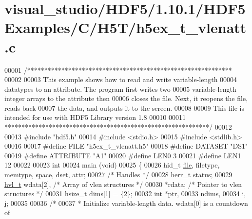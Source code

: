 \hypertarget{visual__studio_2_h_d_f5_21_810_81_2_h_d_f5_examples_2_c_2_h5_t_2h5ex__t__vlenatt_8c_source}{}\section{visual\+\_\+studio/\+H\+D\+F5/1.10.1/\+H\+D\+F5\+Examples/\+C/\+H5\+T/h5ex\+\_\+t\+\_\+vlenatt.c}
\label{visual__studio_2_h_d_f5_21_810_81_2_h_d_f5_examples_2_c_2_h5_t_2h5ex__t__vlenatt_8c_source}

\begin{DoxyCode}
00001 \textcolor{comment}{/************************************************************}
00002 \textcolor{comment}{}
00003 \textcolor{comment}{  This example shows how to read and write variable-length}
00004 \textcolor{comment}{  datatypes to an attribute.  The program first writes two}
00005 \textcolor{comment}{  variable-length integer arrays to the attribute then}
00006 \textcolor{comment}{  closes the file.  Next, it reopens the file, reads back}
00007 \textcolor{comment}{  the data, and outputs it to the screen.}
00008 \textcolor{comment}{}
00009 \textcolor{comment}{  This file is intended for use with HDF5 Library version 1.8}
00010 \textcolor{comment}{}
00011 \textcolor{comment}{ ************************************************************/}
00012 
00013 \textcolor{preprocessor}{#include "hdf5.h"}
00014 \textcolor{preprocessor}{#include <stdio.h>}
00015 \textcolor{preprocessor}{#include <stdlib.h>}
00016 
00017 \textcolor{preprocessor}{#define FILE            "h5ex\_t\_vlenatt.h5"}
00018 \textcolor{preprocessor}{#define DATASET         "DS1"}
00019 \textcolor{preprocessor}{#define ATTRIBUTE       "A1"}
00020 \textcolor{preprocessor}{#define LEN0            3}
00021 \textcolor{preprocessor}{#define LEN1            12}
00022 
00023 \textcolor{keywordtype}{int}
00024 main (\textcolor{keywordtype}{void})
00025 \{
00026     hid\_t       \hyperlink{structfile}{file}, filetype, memtype, space, dset, attr;
00027                                     \textcolor{comment}{/* Handles */}
00028     herr\_t      status;
00029     \hyperlink{structhvl__t}{hvl\_t}       wdata[2],           \textcolor{comment}{/* Array of vlen structures */}
00030                 *rdata;             \textcolor{comment}{/* Pointer to vlen structures */}
00031     hsize\_t     dims[1] = \{2\};
00032     \textcolor{keywordtype}{int}         *ptr,
00033                 ndims,
00034                 i, j;
00035 
00036     \textcolor{comment}{/*}
00037 \textcolor{comment}{     * Initialize variable-length data.  wdata[0] is a countdown of}

\end{DoxyCode}
